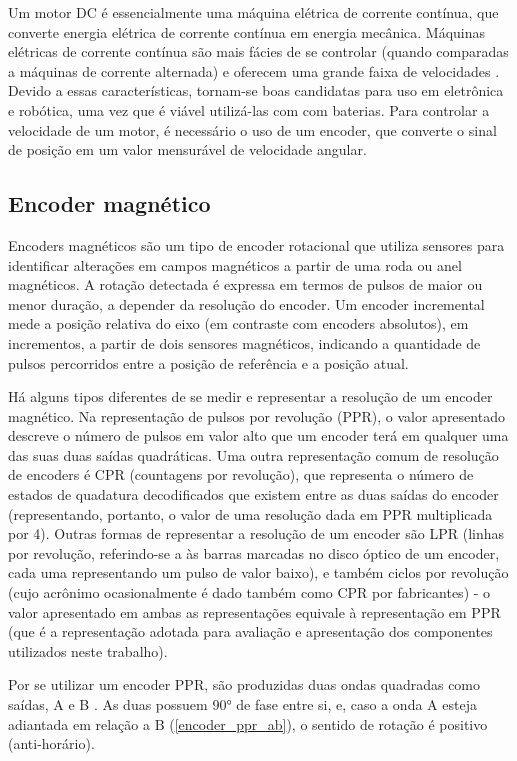 
Um motor DC é essencialmente uma máquina elétrica de corrente contínua, que
converte energia elétrica de corrente contínua em energia mecânica. Máquinas
elétricas de corrente contínua são mais fácies de se controlar (quando
comparadas a máquinas de corrente alternada) e oferecem uma grande faixa de
velocidades \cite{Maquinas_eletricas}. Devido a essas características, tornam-se
boas candidatas para uso em eletrônica e robótica, uma vez que é viável
utilizá-las com com baterias. Para controlar a velocidade de um motor, é
necessário o uso de um encoder, que converte o sinal de posição em um valor
mensurável de velocidade angular.

\subsection{Encoder magnético}

	Encoders magnéticos são um tipo de encoder rotacional que utiliza sensores 
	para identificar alterações em campos magnéticos a partir de uma roda ou 
	anel magnéticos. A rotação detectada é expressa em termos de pulsos de maior
	ou menor duração, a depender da resolução do encoder. Um encoder incremental
	mede a posição relativa do eixo (em contraste com encoders absolutos), em
	incrementos, a partir de dois sensores magnéticos, indicando a quantidade de
	pulsos percorridos entre a posição de referência e a posição atual.
	
	Há alguns tipos diferentes de se medir e representar a resolução de um
	encoder magnético. Na representação de pulsos por revolução (PPR), o valor 
	apresentado descreve o número de pulsos em valor alto que um encoder terá em
	qualquer uma das suas duas saídas quadráticas. Uma outra representação comum
	de resolução de encoders é CPR (countagens por revolução), que representa o
	número de estados de quadatura decodificados que existem entre as duas
	saídas do encoder (representando, portanto, o valor de uma resolução dada em
	PPR multiplicada por 4). Outras formas de representar a resolução de um
	encoder são LPR (linhas por revolução, referindo-se a às barras marcadas no
	disco óptico de um encoder, cada uma representando um pulso de valor baixo),
	e também ciclos por revolução (cujo acrônimo ocasionalmente é dado também
	como CPR por fabricantes) - o valor apresentado em ambas as representações 
	equivale à representação em PPR (que é a representação adotada para
	avaliação e apresentação dos componentes utilizados neste trabalho). 
	
	Por se utilizar um encoder PPR, são produzidas duas ondas quadradas como saídas,
	A e B \cite{encoder_ppr}. As duas possuem 90° de fase entre si, e, caso a onda A
	esteja adiantada em relação a B (\ref{encoder_ppr_ab}), o sentido de rotação é
	positivo (anti-horário).

